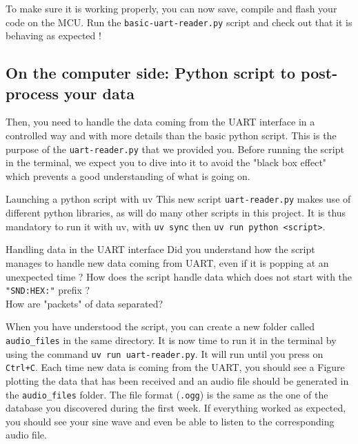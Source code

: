 \noindent To make sure it is working properly, you can now save, compile and flash your code on the MCU. Run the \texttt{basic-uart-reader.py} script and check out that it is behaving as expected !

\subsection*{On the computer side: Python script to post-process your data}

Then, you need to handle the data coming from the UART interface in a controlled way and with more details than the basic python script. This is the purpose of the \texttt{uart-reader.py} that we provided you. Before running the script in the terminal, we expect you to dive into it to avoid the "black box effect" which prevents a good understanding of what is going on.

\begin{bclogo}[couleur = gray!20, arrondi = 0.2, logo=\bcattention]{Launching a python script with uv}
This new script \texttt{uart-reader.py} makes use of different python libraries, as will do many other scripts in this project. It is thus mandatory to run it with uv, with \texttt{uv sync} then \texttt{uv run python <script>}.
\end{bclogo}

\begin{bclogo}[couleur = gray!20, arrondi = 0.2, logo=\bcquestion]{Handling data in the UART interface}
Did you understand how the script manages to handle new data coming from UART, even if it is popping at an unexpected time ? How does the script handle data which does not start with the \texttt{"SND:HEX:"} prefix ? \\

\noindent How are "packets" of data separated?
\end{bclogo}

\noindent When you have understood the script, you can create a new folder called \texttt{audio\_files} in the same directory. It is now time to run it in the terminal by using the command \texttt{uv run uart-reader.py}. It will run until you press on \texttt{Ctrl+C}. Each time new data is coming from the UART, you should see a Figure plotting the data that has been received and an audio file should be generated in the \texttt{audio\_files} folder. The file format (\texttt{.ogg}) is the same as the one of the database you discovered during the first week. If everything worked as expected, you should see your sine wave and even be able to listen to the corresponding audio file.

